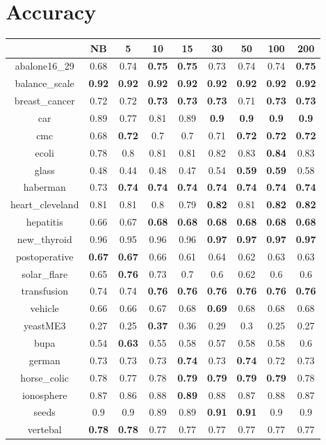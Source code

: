 \documentclass{article}%
\begin{document}
%
\normalsize%
\section*{Accuracy}%
\begin{tabular}{c|cccccccc}%
\hline%
&NB&5&10&15&30&50&100&200\\%
\hline%
abalone16\_29&0.68&0.74&\textbf{0.75}&\textbf{0.75}&0.73&0.74&0.74&\textbf{0.75}\\%
\hline%
balance\_scale&\textbf{0.92}&\textbf{0.92}&\textbf{0.92}&\textbf{0.92}&\textbf{0.92}&\textbf{0.92}&\textbf{0.92}&\textbf{0.92}\\%
\hline%
breast\_cancer&0.72&0.72&\textbf{0.73}&\textbf{0.73}&\textbf{0.73}&0.71&\textbf{0.73}&\textbf{0.73}\\%
\hline%
car&0.89&0.77&0.81&0.89&\textbf{0.9}&\textbf{0.9}&\textbf{0.9}&\textbf{0.9}\\%
\hline%
cmc&0.68&\textbf{0.72}&0.7&0.7&0.71&\textbf{0.72}&\textbf{0.72}&\textbf{0.72}\\%
\hline%
ecoli&0.78&0.8&0.81&0.81&0.82&0.83&\textbf{0.84}&0.83\\%
\hline%
glass&0.48&0.44&0.48&0.47&0.54&\textbf{0.59}&\textbf{0.59}&0.58\\%
\hline%
haberman&0.73&\textbf{0.74}&\textbf{0.74}&\textbf{0.74}&\textbf{0.74}&\textbf{0.74}&\textbf{0.74}&\textbf{0.74}\\%
\hline%
heart\_cleveland&0.81&0.81&0.8&0.79&\textbf{0.82}&0.81&\textbf{0.82}&\textbf{0.82}\\%
\hline%
hepatitis&0.66&0.67&\textbf{0.68}&\textbf{0.68}&\textbf{0.68}&\textbf{0.68}&\textbf{0.68}&\textbf{0.68}\\%
\hline%
new\_thyroid&0.96&0.95&0.96&0.96&\textbf{0.97}&\textbf{0.97}&\textbf{0.97}&\textbf{0.97}\\%
\hline%
postoperative&\textbf{0.67}&\textbf{0.67}&0.66&0.61&0.64&0.62&0.63&0.63\\%
\hline%
solar\_flare&0.65&\textbf{0.76}&0.73&0.7&0.6&0.62&0.6&0.6\\%
\hline%
transfusion&0.74&0.74&\textbf{0.76}&\textbf{0.76}&\textbf{0.76}&\textbf{0.76}&\textbf{0.76}&\textbf{0.76}\\%
\hline%
vehicle&0.66&0.66&0.67&0.68&\textbf{0.69}&0.68&0.68&0.68\\%
\hline%
yeastME3&0.27&0.25&\textbf{0.37}&0.36&0.29&0.3&0.25&0.27\\%
\hline%
bupa&0.54&\textbf{0.63}&0.55&0.58&0.57&0.58&0.58&0.6\\%
\hline%
german&0.73&0.73&0.73&\textbf{0.74}&0.73&\textbf{0.74}&0.72&0.73\\%
\hline%
horse\_colic&0.78&0.77&0.78&\textbf{0.79}&\textbf{0.79}&\textbf{0.79}&\textbf{0.79}&0.78\\%
\hline%
ionosphere&0.87&0.86&0.88&\textbf{0.89}&0.88&0.87&0.88&0.87\\%
\hline%
seeds&0.9&0.9&0.89&0.89&\textbf{0.91}&\textbf{0.91}&0.9&0.9\\%
\hline%
vertebal&\textbf{0.78}&\textbf{0.78}&0.77&0.77&0.77&0.77&0.77&0.77\\%
\hline%
\end{tabular}
\end{document}
